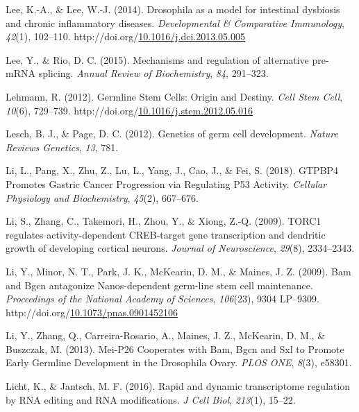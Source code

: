 \documentclass[12pt,oneside]{reedthesis}
\newlength{\cslhangindent}
\newenvironment{CSLReferences}[2] %
 {%
  \setlength{\parindent}{0pt}
  \ifodd #1 \everypar{\setlength{\hangindent}{\cslhangindent}}\ignorespaces\fi
  \ifnum #2 > 0
  \setlength{\parskip}{#2\baselineskip}
  \fi
 }%
 {}
\begin{document}
\begin{CSLReferences}{1}{0}
\leavevmode{}%
Lee, K.-A., \& Lee, W.-J. (2014). Drosophila as a model for intestinal dysbiosis and chronic inflammatory diseases. \emph{Developmental \& Comparative Immunology}, \emph{42}(1), 102--110. http://doi.org/\href{https://doi.org/10.1016/j.dci.2013.05.005}{10.1016/j.dci.2013.05.005}

\leavevmode{}%
Lee, Y., \& Rio, D. C. (2015). Mechanisms and regulation of alternative pre-{mRNA} splicing. \emph{Annual Review of Biochemistry}, \emph{84}, 291--323.

\leavevmode{}%
Lehmann, R. (2012). Germline {Stem Cells}: {Origin} and {Destiny}. \emph{Cell Stem Cell}, \emph{10}(6), 729--739. http://doi.org/\href{https://doi.org/10.1016/j.stem.2012.05.016}{10.1016/j.stem.2012.05.016}

\leavevmode{}%
Lesch, B. J., \& Page, D. C. (2012). Genetics of germ cell development. \emph{Nature Reviews Genetics}, \emph{13}, 781.

\leavevmode{}%
Li, L., Pang, X., Zhu, Z., Lu, L., Yang, J., Cao, J., \& Fei, S. (2018). {GTPBP4 Promotes Gastric Cancer Progression} via {Regulating P53 Activity}. \emph{Cellular Physiology and Biochemistry}, \emph{45}(2), 667--676.

\leavevmode{}%
Li, S., Zhang, C., Takemori, H., Zhou, Y., \& Xiong, Z.-Q. (2009). {TORC1} regulates activity-dependent {CREB-target} gene transcription and dendritic growth of developing cortical neurons. \emph{Journal of Neuroscience}, \emph{29}(8), 2334--2343.

\leavevmode{}%
Li, Y., Minor, N. T., Park, J. K., McKearin, D. M., \& Maines, J. Z. (2009). Bam and {Bgcn} antagonize {Nanos-dependent} germ-line stem cell maintenance. \emph{Proceedings of the National Academy of Sciences}, \emph{106}(23), 9304 LP--9309. http://doi.org/\href{https://doi.org/10.1073/pnas.0901452106}{10.1073/pnas.0901452106}

\leavevmode{}%
Li, Y., Zhang, Q., Carreira-Rosario, A., Maines, J. Z., McKearin, D. M., \& Buszczak, M. (2013). Mei-{P26 Cooperates} with {Bam}, {Bgcn} and {Sxl} to {Promote Early Germline Development} in the {Drosophila Ovary}. \emph{PLOS ONE}, \emph{8}(3), e58301.

\leavevmode{}%
Licht, K., \& Jantsch, M. F. (2016). Rapid and dynamic transcriptome regulation by {RNA} editing and {RNA} modifications. \emph{J Cell Biol}, \emph{213}(1), 15--22.


\end{CSLReferences}
\end{document}
